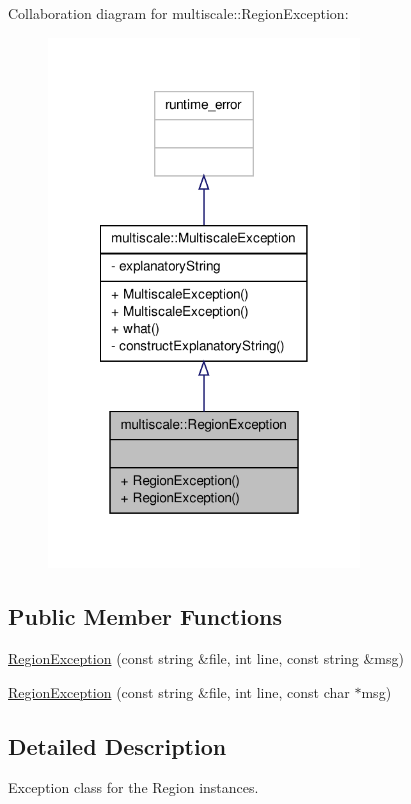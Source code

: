 Collaboration diagram for multiscale\-:\-:Region\-Exception\-:
\nopagebreak
\begin{figure}[H]
\begin{center}
\leavevmode
\includegraphics[width=234pt]{classmultiscale_1_1RegionException__coll__graph}
\end{center}
\end{figure}
\subsection*{Public Member Functions}
\begin{DoxyCompactItemize}
\item 
\hyperlink{classmultiscale_1_1RegionException_a10febb34060369b6d579cd8ce1958133}{Region\-Exception} (const string \&file, int line, const string \&msg)
\item 
\hyperlink{classmultiscale_1_1RegionException_a2be955d2fe444a4a4f2567d7a6599a9b}{Region\-Exception} (const string \&file, int line, const char $\ast$msg)
\end{DoxyCompactItemize}


\subsection{Detailed Description}
Exception class for the Region instances. 

